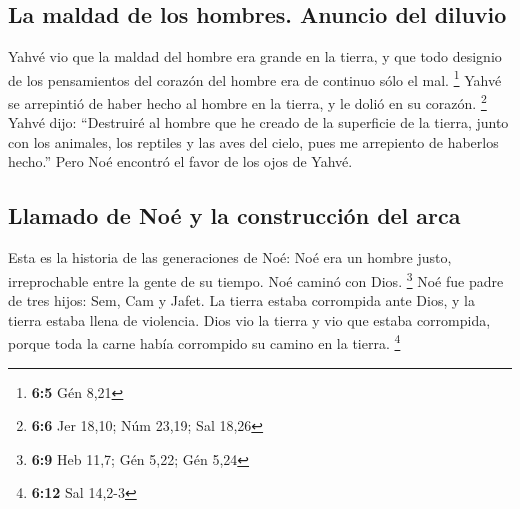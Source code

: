 \hypertarget{la-maldad-de-los-hombres.-anuncio-del-diluvio}{%
\subsection{La maldad de los hombres. Anuncio del
diluvio}\label{la-maldad-de-los-hombres.-anuncio-del-diluvio}}

 Yahvé vio que la maldad del hombre era grande en la
tierra, y que todo designio de los pensamientos del corazón del hombre
era de continuo sólo el mal. \footnote{\textbf{6:5} Gén 8,21}
 Yahvé se arrepintió de haber hecho al hombre en la
tierra, y le dolió en su corazón. \footnote{\textbf{6:6} Jer 18,10; Núm
  23,19; Sal 18,26}  Yahvé dijo: ``Destruiré al hombre que
he creado de la superficie de la tierra, junto con los animales, los
reptiles y las aves del cielo, pues me arrepiento de haberlos hecho.''
 Pero Noé encontró el favor de los ojos de Yahvé.

\hypertarget{llamado-de-nouxe9-y-la-construcciuxf3n-del-arca}{%
\subsection{Llamado de Noé y la construcción del
arca}\label{llamado-de-nouxe9-y-la-construcciuxf3n-del-arca}}

 Esta es la historia de las generaciones de Noé: Noé era
un hombre justo, irreprochable entre la gente de su tiempo. Noé caminó
con Dios. \footnote{\textbf{6:9} Heb 11,7; Gén 5,22; Gén 5,24}
 Noé fue padre de tres hijos: Sem, Cam y Jafet.
 La tierra estaba corrompida ante Dios, y la tierra
estaba llena de violencia.  Dios vio la tierra y vio que
estaba corrompida, porque toda la carne había corrompido su camino en la
tierra. \footnote{\textbf{6:12} Sal 14,2-3}

